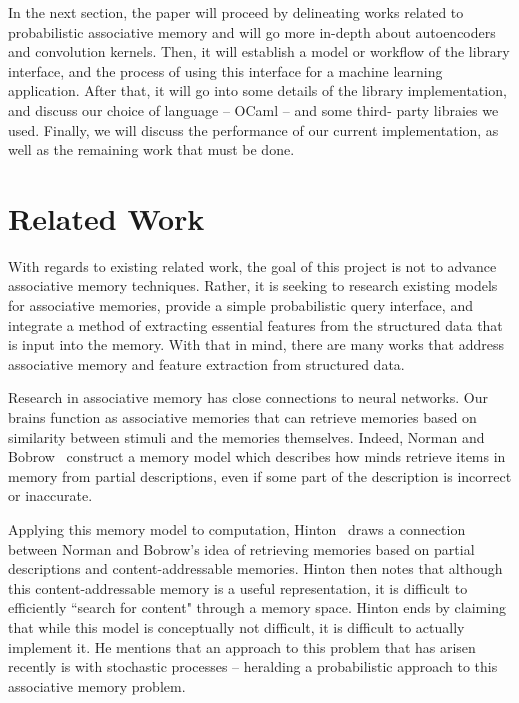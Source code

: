 \documentclass{sig-alternate}
\begin{document}
In the next section, the paper will proceed by delineating works related to 
probabilistic associative memory and will go more in-depth about autoencoders 
and convolution kernels. Then, it will establish a model or workflow of the 
library interface, and the process of using this interface for a machine
learning application. After that, it will go into some details of the library
implementation, and discuss our choice of language -- OCaml -- and some third-
party libraies we used. Finally, we will discuss the performance of our current
implementation, as well as the remaining work that must be done.

\section{Related Work}
\label{sec:related_work}

With regards to existing related work, the goal of this project is not to advance associative memory 
techniques. Rather, it is seeking to research existing models for associative memories, provide a 
simple probabilistic query interface, and integrate a method of extracting essential features from 
the structured data that is input into the memory. With that in mind, there are many works that 
address associative memory and feature extraction from structured data.

Research in associative memory has close connections to neural networks. Our brains function as 
associative memories that can retrieve memories based on similarity between stimuli and the memories 
themselves.  Indeed, Norman and Bobrow~\cite{bobrow} construct a memory model which describes how 
minds retrieve items in memory from partial descriptions, even if some part of the description is 
incorrect or inaccurate. 

Applying this memory model to computation, Hinton~\cite{hinton} draws a connection between Norman 
and Bobrow's idea of retrieving memories based on partial descriptions and content-addressable 
memories.  Hinton then notes that although this content-addressable memory is a useful 
representation, it is difficult to efficiently ``search for content" through a memory space. 
Hinton ends by claiming that while this model is conceptually not difficult, it is difficult to 
actually implement it. He mentions that an approach to this problem that has arisen recently is with 
stochastic processes -- heralding a probabilistic approach to this associative memory problem.
\end{document}
